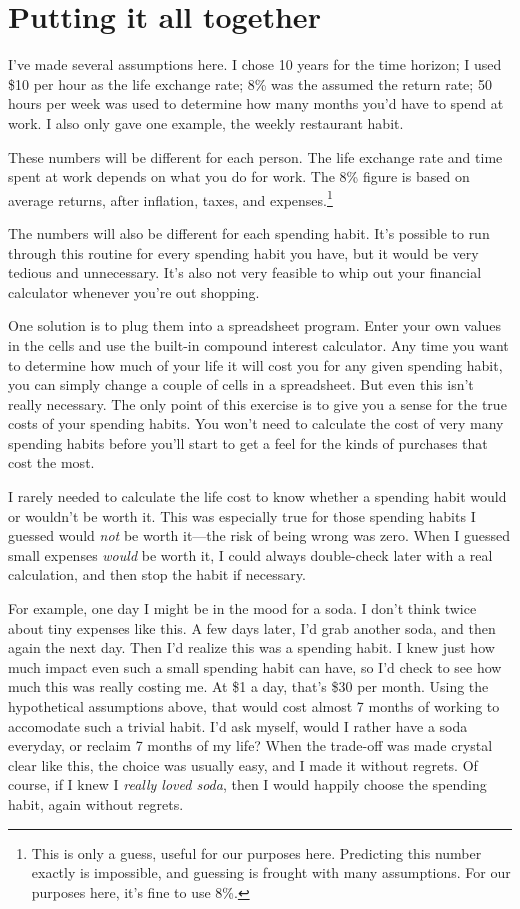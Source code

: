 \section{Putting it all together}
I've made several assumptions here. I chose 10 years for the time horizon; I used \$10 per hour as the life exchange rate; 8\% was the assumed the return rate; 50 hours per week was used to determine how many months you'd have to spend at work. I also only gave one example, the weekly restaurant habit.

These numbers will be different for each person. The life exchange rate and time spent at work depends on what you do for work. The 8\% figure is based on average returns, after inflation, taxes, and expenses.\footnote{This is only a guess, useful for our purposes here. Predicting this number exactly is impossible, and guessing is frought with many assumptions. For our purposes here, it's fine to use 8\%.}

The numbers will also be different for each spending habit. It's possible to run through this routine for every spending habit you have, but it would be very tedious and unnecessary. It's also not very feasible to whip out your financial calculator whenever you're out shopping.

One solution is to plug them into a spreadsheet program. Enter your own values in the cells and use the built-in compound interest calculator. Any time you want to determine how much of your life it will cost you for any given spending habit, you can simply change a couple of cells in a spreadsheet. But even this isn't really necessary. The only point of this exercise is to give you a sense for the true costs of your spending habits. You won't need to calculate the cost of very many spending habits before you'll start to get a feel for the kinds of purchases that cost the most.

I rarely needed to calculate the life cost to know whether a spending habit would or wouldn't be worth it. This was especially true for those spending habits I guessed would \emph{not} be worth it---the risk of being wrong was zero. When I guessed small expenses \emph{would} be worth it, I could always double-check later with a real calculation, and then stop the habit if necessary.

For example, one day I might be in the mood for a soda. I don't think twice about tiny expenses like this. A few days later, I'd grab another soda, and then again the next day. Then I'd realize this was a spending habit. I knew just how much impact even such a small spending habit can have, so I'd check to see how much this was really costing me. At \$1 a day, that's \$30 per month. Using the hypothetical assumptions above, that would cost almost 7 months of working to accomodate such a trivial habit. I'd ask myself, would I rather have a soda everyday, or reclaim 7 months of my life? When the trade-off was made crystal clear like this, the choice was usually easy, and I made it without regrets. Of course, if I knew I \emph{really loved soda}, then I would happily choose the spending habit, again without regrets.

